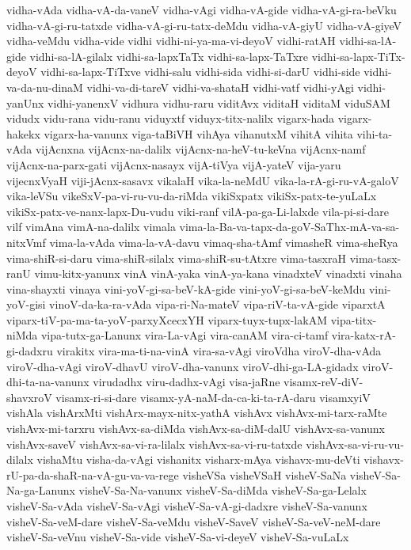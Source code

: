 {vidha-vAda
vidha-vA-da-vaneV
vidha-vAgi
vidha-vA-gide
vidha-vA-gi-ra-beVku
vidha-vA-gi-ru-tatxde
vidha-vA-gi-ru-tatx-deMdu
vidha-vA-giyU
vidha-vA-giyeV
vidha-veMdu
vidha-vide
vidhi
vidhi-ni-ya-ma-vi-deyoV
vidhi-ratAH
vidhi-sa-lA-gide
vidhi-sa-lA-gilalx
vidhi-sa-lapxTaTx
vidhi-sa-lapx-TaTxre
vidhi-sa-lapx-TiTx-deyoV
vidhi-sa-lapx-TiTxve
vidhi-salu
vidhi-sida
vidhi-si-darU
vidhi-side
vidhi-va-da-nu-dinaM
vidhi-va-di-tareV
vidhi-va-shataH
vidhi-vatf
vidhi-yAgi
vidhi-yanUnx
vidhi-yanenxV
vidhura
vidhu-raru
viditAvx
viditaH
viditaM
viduSAM
vidudx
vidu-rana
vidu-ranu
viduyxtf
viduyx-titx-nalilx
vigarx-hada
vigarx-hakekx
vigarx-ha-vanunx
viga-taBiVH
vihAya
vihanutxM
vihitA
vihita
vihi-ta-vAda
vijAcnxna
vijAcnx-na-dalilx
vijAcnx-na-heV-tu-keVna
vijAcnx-namf
vijAcnx-na-parx-gati
vijAcnx-nasayx
vijA-tiVya
vijA-yateV
vija-yaru
vijecnxVyaH
viji-jAcnx-sasavx
vikalaH
vika-la-neMdU
vika-la-rA-gi-ru-vA-galoV
vika-leVSu
vikeSxV-pa-vi-ru-vu-da-riMda
vikiSxpatx
vikiSx-patx-te-yuLaLx
vikiSx-patx-ve-nanx-lapx-Du-vudu
viki-ranf
vilA-pa-ga-Li-lalxde
vila-pi-si-dare
vilf
vimAna
vimA-na-dalilx
vimala
vima-la-Ba-va-tapx-da-goV-SaThx-mA-va-sa-nitxVmf
vima-la-vAda
vima-la-vA-davu
vimaq-sha-tAmf
vimasheR
vima-sheRya
vima-shiR-si-daru
vima-shiR-silalx
vima-shiR-su-tAtxre
vima-tasxraH
vima-tasx-ranU
vimu-kitx-yanunx
vinA
vinA-yaka
vinA-ya-kana
vinadxteV
vinadxti
vinaha
vina-shayxti
vinaya
vini-yoV-gi-sa-beV-kA-gide
vini-yoV-gi-sa-beV-keMdu
vini-yoV-gisi
vinoV-da-ka-ra-vAda
vipa-ri-Na-mateV
vipa-riV-ta-vA-gide
viparxtA
viparx-tiV-pa-ma-ta-yoV-parxyXcecxYH
viparx-tuyx-tupx-lakAM
vipa-titx-niMda
vipa-tutx-ga-Lanunx
vira-La-vAgi
vira-canAM
vira-ci-tamf
vira-katx-rA-gi-dadxru
virakitx
vira-ma-ti-na-vinA
vira-sa-vAgi
viroVdha
viroV-dha-vAda
viroV-dha-vAgi
viroV-dhavU
viroV-dha-vanunx
viroV-dhi-ga-LA-gidadx
viroV-dhi-ta-na-vanunx
virudadhx
viru-dadhx-vAgi
visa-jaRne
visamx-reV-diV-shavxroV
visamx-ri-si-dare
visamx-yA-naM-da-ca-ki-ta-rA-daru
visamxyiV
vishAla
vishArxMti
vishArx-mayx-nitx-yathA
vishAvx
vishAvx-mi-tarx-raMte
vishAvx-mi-tarxru
vishAvx-sa-diMda
vishAvx-sa-diM-dalU
vishAvx-sa-vanunx
vishAvx-saveV
vishAvx-sa-vi-ra-lilalx
vishAvx-sa-vi-ru-tatxde
vishAvx-sa-vi-ru-vu-dilalx
vishaMtu
visha-da-vAgi
vishanitx
visharx-mAya
vishavx-mu-deVti
vishavx-rU-pa-da-shaR-na-vA-gu-va-va-rege
visheVSa
visheVSaH
visheV-SaNa
visheV-Sa-Na-ga-Lanunx
visheV-Sa-Na-vanunx
visheV-Sa-diMda
visheV-Sa-ga-Lelalx
visheV-Sa-vAda
visheV-Sa-vAgi
visheV-Sa-vA-gi-dadxre
visheV-Sa-vanunx
visheV-Sa-veM-dare
visheV-Sa-veMdu
visheV-SaveV
visheV-Sa-veV-neM-dare
visheV-Sa-veVnu
visheV-Sa-vide
visheV-Sa-vi-deyeV
visheV-Sa-vuLaLx
}
